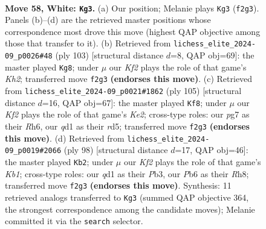 \documentclass[11pt]{article}
\begin{document}
\clearpage

\begin{figure}[p]\centering
\begin{subfigure}{0.46\textwidth}\centering
\resizebox{\linewidth}{!}{%
\newchessgame
\chessboard[
  setfen={8/6pk/1P6/8/3ppP2/8/5K1r/3q4 w - - 5 58},
  showmover=false,
  pgfstyle=straightmove, color=movearrow, markmove={f2-g3}
]}
\caption{}
\end{subfigure}\hfill
\begin{subfigure}{0.46\textwidth}\centering
\resizebox{\linewidth}{!}{%
\newchessgame
\chessboard[
  setfen={8/7k/5Q2/7R/6P1/1p6/1P4PK/8 b - - 4 52},
  showmover=false,
  pgfstyle=straightmove, color=movearrow, markmove={h7-g8}
]}
\caption{}
\end{subfigure}
\\[4pt]
\begin{subfigure}{0.46\textwidth}\centering
\resizebox{\linewidth}{!}{%
\newchessgame
\chessboard[
  setfen={8/4k1R1/7r/3R1K2/1p3P2/1P6/8/8 b - - 1 53},
  showmover=false,
  pgfstyle=straightmove, color=movearrow, markmove={e7-f8}
]}
\caption{}
\end{subfigure}\hfill
\begin{subfigure}{0.46\textwidth}\centering
\resizebox{\linewidth}{!}{%
\newchessgame
\chessboard[
  setfen={7R/8/1p2kp2/2p5/2P5/1P6/8/1K2r3 w - - 2 50},
  showmover=false,
  pgfstyle=straightmove, color=movearrow, markmove={b1-b2}
]}
\caption{}
\end{subfigure}
\caption{\textbf{Move 58, White: \texttt{Kg3}.} (a) Our position; Melanie plays \texttt{Kg3} (\texttt{f2g3}). Panels (b)--(d) are the retrieved master positions whose correspondence most drove this move (highest QAP objective among those that transfer to it). (b) Retrieved from \texttt{lichess\_elite\_2024-09\_p0026\#48} (ply 103) [structural distance $d$=8, QAP obj=69]: the master played \texttt{Kg8}; under $\mu$ our \emph{Kf2} plays the role of that game's \emph{Kh2}; transferred move \texttt{f2g3} \textbf{(endorses this move)}. (c) Retrieved from \texttt{lichess\_elite\_2024-09\_p0021\#1862} (ply 105) [structural distance $d$=16, QAP obj=67]: the master played \texttt{Kf8}; under $\mu$ our \emph{Kf2} plays the role of that game's \emph{Ke2}; cross-type roles: our \emph{p}g7 as their \emph{R}h6, our \emph{q}d1 as their \emph{r}d5; transferred move \texttt{f2g3} \textbf{(endorses this move)}. (d) Retrieved from \texttt{lichess\_elite\_2024-09\_p0019\#2066} (ply 98) [structural distance $d$=17, QAP obj=46]: the master played \texttt{Kb2}; under $\mu$ our \emph{Kf2} plays the role of that game's \emph{Kb1}; cross-type roles: our \emph{q}d1 as their \emph{P}b3, our \emph{P}b6 as their \emph{R}h8; transferred move \texttt{f2g3} \textbf{(endorses this move)}. Synthesis: 11 retrieved analogs transferred to \texttt{Kg3} (summed QAP objective 364, the strongest correspondence among the candidate moves); Melanie committed it via the \texttt{search} selector.}
\label{fig:thought-m114}
\end{figure}
\end{document}
